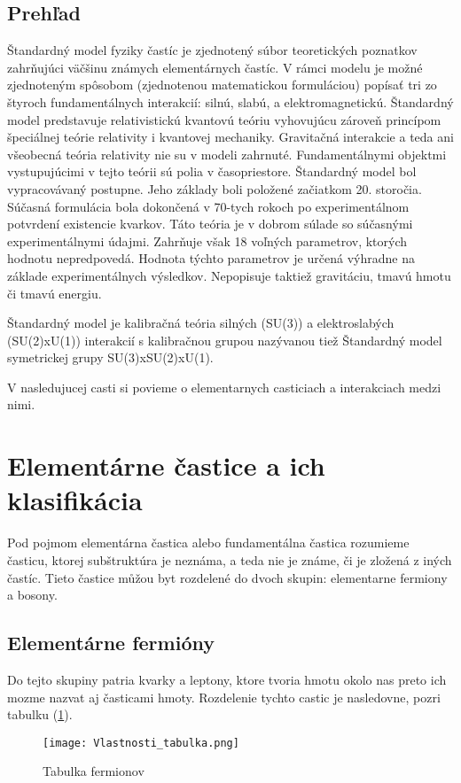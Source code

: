 \documentclass[../../main.tex]{subfiles}
\begin{document}
\subsection{Prehľad}
Štandardný model fyziky častíc je zjednotený súbor teoretických poznatkov zahrňujúci väčšinu známych elementárnych častíc. V rámci modelu je možné zjednoteným spôsobom (zjednotenou matematickou formuláciou) popísať tri zo štyroch fundamentálnych interakcií: silnú, slabú, a elektromagnetickú. Štandardný model predstavuje relativistickú kvantovú teóriu vyhovujúcu zároveň princípom špeciálnej teórie relativity i kvantovej mechaniky. Gravitačná interakcie a teda ani všeobecná teória relativity nie su v modeli zahrnuté. Fundamentálnymi objektmi vystupujúcimi v tejto teórii sú polia v časopriestore. Štandardný model bol vypracovávaný postupne. Jeho základy boli položené začiatkom 20. storočia. Súčasná formulácia bola dokončená v 70-tych rokoch po experimentálnom potvrdení existencie kvarkov. Táto teória je v dobrom súlade so súčasnými experimentálnymi údajmi. Zahrňuje však 18 voľných parametrov, ktorých hodnotu nepredpovedá. Hodnota týchto parametrov je určená výhradne na základe experimentálnych výsledkov. Nepopisuje taktiež gravitáciu, tmavú hmotu či tmavú energiu.\par 
Štandardný model je kalibračná teória silných (SU(3)) a elektroslabých (SU(2)xU(1)) interakcií s kalibračnou grupou nazývanou tiež Štandardný model symetrickej grupy SU(3)xSU(2)xU(1).\par
V nasledujucej casti si povieme o elementarnych casticiach a interakciach medzi nimi.

\section{Elementárne častice a ich klasifikácia} 
Pod pojmom elementárna častica alebo fundamentálna častica rozumieme časticu, ktorej subštruktúra je neznáma, a teda nie je známe, či je zložená z iných častíc. Tieto častice můžou byt rozdelené do dvoch skupin: elementarne fermiony a bosony.
\subsection{Elementárne fermióny} 
Do tejto skupiny patria kvarky a leptony, ktore tvoria hmotu okolo nas preto ich mozme nazvat aj časticami hmoty. Rozdelenie tychto castic je nasledovne, pozri tabulku (\ref{sf1:fig:Tabulka_fermionov}).
\begin{figure}[!h]
\texttt{[image: Vlastnosti\_tabulka.png]}
\caption{Tabulka fermionov}
\label{sf1:fig:Tabulka_fermionov}
\end{figure}
\end{document}
